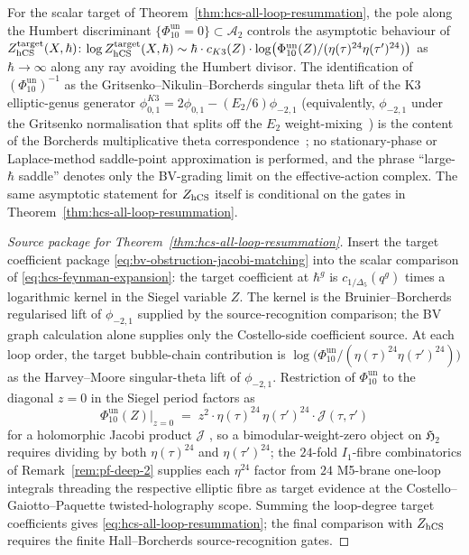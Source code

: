 \begin{proposition}
\label{prop:hcs-large-hbar-limit}
For the scalar target of Theorem~\ref{thm:hcs-all-loop-resummation},
the pole along the Humbert discriminant
$\{\Phi_{10}^{\mathrm{un}}=0\}\subset\mathcal{A}_{2}$
controls the asymptotic behaviour of
$Z_{\mathrm{hCS}}^{\mathrm{target}}(X,\hbar)$:
$\log Z_{\mathrm{hCS}}^{\mathrm{target}}(X, \hbar) \sim
\hbar \cdot c_{K3}(Z) \cdot
\log\bigl(\Phi_{10}^{\mathrm{un}}(Z)/(\eta(\tau)^{24}\eta(\tau')^{24})\bigr)$ as
$\hbar \to \infty$ along any ray avoiding the Humbert divisor. The
identification of $(\Phi_{10}^{\mathrm{un}})^{-1}$ as the Gritsenko--Nikulin--Borcherds
singular theta lift of the K3 elliptic-genus generator
$\phi_{0,1}^{K3} = 2\phi_{0,1} - (E_{2}/6)\phi_{-2,1}$
(equivalently, $\phi_{-2,1}$ under the Gritsenko normalisation that
splits off the $E_2$ weight-mixing~\cite[\S 13]{Borcherds1998}) is the
content of the Borcherds multiplicative theta
correspondence~\cite{GritsenkoNikulin1998}; no stationary-phase or
Laplace-method saddle-point approximation is performed, and the
phrase ``large-$\hbar$ saddle'' denotes only the BV-grading limit on
the effective-action complex.  The same asymptotic statement for
$Z_{\mathrm{hCS}}$ itself is conditional on the gates in
Theorem~\ref{thm:hcs-all-loop-resummation}.
\end{proposition}

\begin{proof}[Source package for Theorem~\ref{thm:hcs-all-loop-resummation}]
Insert the target coefficient package \eqref{eq:bv-obstruction-jacobi-matching}
into the scalar comparison of \eqref{eq:hcs-feynman-expansion}: the
target coefficient at $\hbar^{g}$ is $c_{1/\Delta_{5}}(q^{g})$ times a
logarithmic kernel in the Siegel variable $Z$. The kernel is the
Bruinier--Borcherds regularised lift of $\phi_{-2,1}$ supplied by the
source-recognition comparison; the BV graph calculation alone supplies
only the Costello-side coefficient source.  At each loop order, the
target bubble-chain contribution is
$\log\bigl(\Phi_{10}^{\mathrm{un}}/(\eta(\tau)^{24}\eta(\tau')^{24})\bigr)$ as the
Harvey--Moore singular-theta lift of $\phi_{-2,1}$.
Restriction of $\Phi_{10}^{\mathrm{un}}$ to the diagonal $z=0$ in the Siegel period
factors as
\[
 \Phi_{10}^{\mathrm{un}}(Z)\big|_{z=0}
 \;=\;
 z^{2}\cdot\eta(\tau)^{24}\,\eta(\tau')^{24}\cdot\mathcal J(\tau,\tau')
\]
for a holomorphic Jacobi product $\mathcal J$
\cite{GritsenkoNikulin1998,DijkgraafVerlindeVerlinde1997},
so a bimodular-weight-zero object on $\mathfrak H_{2}$ requires
dividing by both $\eta(\tau)^{24}$ and $\eta(\tau')^{24}$; the
$24$-fold $I_{1}$-fibre combinatorics of
Remark~\ref{rem:pf-deep-2} supplies each $\eta^{24}$ factor from
$24$ M5-brane one-loop integrals threading the respective elliptic
fibre as target evidence at the Costello--Gaiotto--Paquette
twisted-holography scope.  Summing the loop-degree target coefficients
gives \eqref{eq:hcs-all-loop-resummation}; the final comparison with
$Z_{\mathrm{hCS}}$ requires the finite Hall--Borcherds source-recognition gates.
\end{proof}

